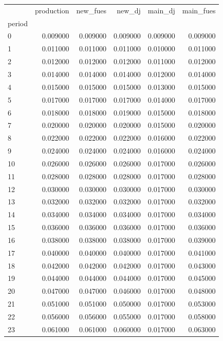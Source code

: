 \begin{tabular}{lrrrrr}
\toprule
 & production & new_fues & new_dj & main_dj & main_fues \\
period &  &  &  &  &  \\
\midrule
0 & 0.009000 & 0.009000 & 0.009000 & 0.009000 & 0.009000 \\
1 & 0.011000 & 0.011000 & 0.011000 & 0.010000 & 0.011000 \\
2 & 0.012000 & 0.012000 & 0.012000 & 0.011000 & 0.012000 \\
3 & 0.014000 & 0.014000 & 0.014000 & 0.012000 & 0.014000 \\
4 & 0.015000 & 0.015000 & 0.015000 & 0.013000 & 0.015000 \\
5 & 0.017000 & 0.017000 & 0.017000 & 0.014000 & 0.017000 \\
6 & 0.018000 & 0.018000 & 0.019000 & 0.015000 & 0.018000 \\
7 & 0.020000 & 0.020000 & 0.020000 & 0.015000 & 0.020000 \\
8 & 0.022000 & 0.022000 & 0.022000 & 0.016000 & 0.022000 \\
9 & 0.024000 & 0.024000 & 0.024000 & 0.016000 & 0.024000 \\
10 & 0.026000 & 0.026000 & 0.026000 & 0.017000 & 0.026000 \\
11 & 0.028000 & 0.028000 & 0.028000 & 0.017000 & 0.028000 \\
12 & 0.030000 & 0.030000 & 0.030000 & 0.017000 & 0.030000 \\
13 & 0.032000 & 0.032000 & 0.032000 & 0.017000 & 0.032000 \\
14 & 0.034000 & 0.034000 & 0.034000 & 0.017000 & 0.034000 \\
15 & 0.036000 & 0.036000 & 0.036000 & 0.017000 & 0.036000 \\
16 & 0.038000 & 0.038000 & 0.038000 & 0.017000 & 0.039000 \\
17 & 0.040000 & 0.040000 & 0.040000 & 0.017000 & 0.041000 \\
18 & 0.042000 & 0.042000 & 0.042000 & 0.017000 & 0.043000 \\
19 & 0.044000 & 0.044000 & 0.044000 & 0.017000 & 0.045000 \\
20 & 0.047000 & 0.047000 & 0.046000 & 0.017000 & 0.048000 \\
21 & 0.051000 & 0.051000 & 0.050000 & 0.017000 & 0.053000 \\
22 & 0.056000 & 0.056000 & 0.055000 & 0.017000 & 0.058000 \\
23 & 0.061000 & 0.061000 & 0.060000 & 0.017000 & 0.063000 \\

\end{tabular}
